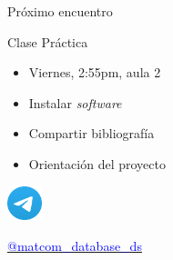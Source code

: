 \begin{frame}{Pr\'oximo encuentro}
            \begin{block}{Clase Pr\'actica}
                \begin{itemize}
                    \item Viernes, 2:55pm, aula 2
                    \item Instalar \textit{software}
                    \item Compartir bibliograf\'ia
                    \item \alert<2>{Orientaci\'on del proyecto}
                \end{itemize}
            \end{block}
            
            \centering
            \includegraphics[width=1cm]{img/telegram.png}
            
            \href{https://t.me/matcom_database_ds}{\textcolor{blue}{@matcom\_database\_ds}}
     
\end{frame}